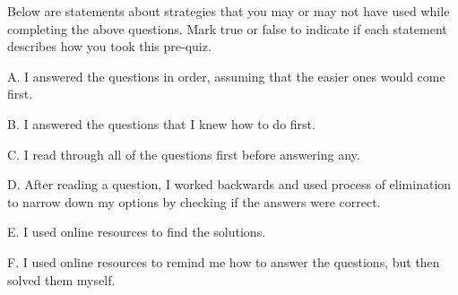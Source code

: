 \documentclass{ximera}
\begin{document}
\begin{problem}

Below are statements about strategies that you may or may not have used while completing the above questions.  Mark true or false to indicate if each statement describes how you took this pre-quiz. 

\vspace{1 in}

A. I answered the questions in order, assuming that the easier ones would come first.

    \begin{multipleChoice}
    \end{multipleChoice}
    
    B. I answered the questions that I knew how to do first.

    \begin{multipleChoice}
    \end{multipleChoice}
    
    C. I read through all of the questions first before answering any.

    \begin{multipleChoice}
    \end{multipleChoice}
    
    D. After reading a question, I worked backwards and used process of elimination to narrow down my options by checking if the answers were correct.

    \begin{multipleChoice}
    \end{multipleChoice}
    
    E. I used online resources to find the solutions.

    \begin{multipleChoice}
    \end{multipleChoice}
    
    F. I used online resources to remind me how to answer the questions, but then solved them myself.

    \begin{multipleChoice}
    \end{multipleChoice}
    

\end{problem}
\end{document}

